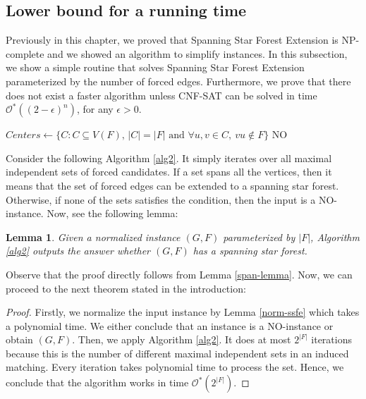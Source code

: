\documentclass[en]{pracamgr}
\newtheorem{lemma}{Lemma}
\theoremstyle{definition}
\newcommand{\ssf}{spanning star forest}
\newcommand{\ssfep}{{\sc Spanning Star Forest Extension}}
\newcommand{\cnfsat}{{\sc CNF-SAT}}
\begin{document}
\subsection{Lower bound for a running time}

Previously in this chapter, we proved that \ssfep{} is NP-complete and we showed an algorithm to simplify instances. In this subsection, we show a simple routine that solves \ssfep{} parameterized by the number of forced edges. Furthermore, we prove that there does not exist a faster algorithm unless \cnfsat{} can be solved in time $\mathcal{O}^*((2-\epsilon)^n)$, for any $\epsilon>0$.

\begin{algorithm}\label{alg2}
	\KwResult{\ssf{} of $G$ extending $F$}
	$Centers \leftarrow \{C: C \subseteq V(F) \text{, }|C|=|F| \text{ and } \forall u,v \in C,\ vu \notin F\}$\;
	\Return NO\;
	\caption{Finding a spanning star forest in a normalized graph with forced edges.}
\end{algorithm}

Consider the following Algorithm \ref{alg2}. It simply iterates over all maximal independent sets of forced candidates. If a set spans all the vertices, then it means that the set of forced edges can be extended to a spanning star forest. Otherwise, if none of the sets satisfies the condition, then the input is a NO-instance. Now, see the following lemma:

\begin{lemma}\label{alg2-correctness}
	Given a normalized instance $(G,F)$ parameterized by $|F|$, Algorithm \ref{alg2} outputs the answer whether $(G,F)$ has a spanning star forest.
\end{lemma}

Observe that the proof directly follows from Lemma \ref{span-lemma}. Now, we can proceed to the next theorem stated in the introduction:

\thmssfepfetime*

\begin{proof}
	Firstly, we normalize the input instance by Lemma \ref{norm-ssfe} which takes a polynomial time. We either conclude that an instance is a NO-instance or obtain $(G,F)$. Then, we apply Algorithm \ref{alg2}. It does at most $2^{|F|}$ iterations because this is the number of different maximal independent sets in an induced matching. Every iteration takes polynomial time to process the set. Hence, we conclude that the algorithm works in time $\mathcal{O}^*(2^{|F|})$.
\end{proof}
\end{document}
